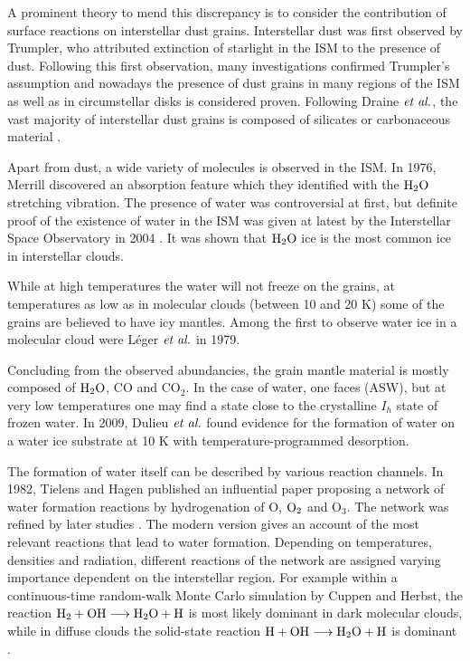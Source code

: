 \documentclass[8.5pt,twoside,twocolumn]{article}
\theoremstyle{standard}
\begin{document}
A prominent theory to mend this discrepancy is to consider the
contribution of surface reactions on interstellar dust
grains\cite{WilliamsHerbst2002}.
Interstellar dust was first observed by Trumpler\cite{Trumpler1930}, who attributed extinction of starlight in the ISM to the presence of dust. Following this first
observation, many investigations confirmed Trumpler's assumption and nowadays the presence
of dust grains in many regions of the ISM as well as in circumstellar disks is
considered proven. Following Draine $\emph{et al.}$, the vast majority of interstellar
dust grains is composed of silicates or carbonaceous material \cite{Draine2003}.

Apart from dust, a wide variety of molecules is observed in the ISM. In
1976, Merrill  \cite{Merrill1976} discovered an absorption feature
which they identified with the $\text H _2 \text O$ stretching vibration. The presence of
water was controversial at first, but definite proof of the existence of water
in the ISM was given at latest by the Interstellar Space Observatory in 2004
\cite{Gibb2004}. It was shown that $\text H _2 \text O$ ice is the most common ice in
interstellar clouds.

While at high temperatures the water will not freeze on the grains, at
temperatures as low as in molecular clouds (between 10 and 20
K\cite{Ferriere2001}) some of the grains are believed to have icy mantles.
Among the first to observe water ice in a molecular cloud were Léger $\emph{et al.}$ in
1979\cite{Leger1979}.

Concluding from the observed abundancies, the grain mantle material is mostly
composed of $\text H _2 \text O$, CO and CO$_2$.
In the case of water, one faces  (ASW), but at very
low temperatures one may find a state close to the crystalline $I_h$ state of
frozen water. In 2009, Dulieu $\emph{et al.}$ found evidence for the formation of water
on a water ice substrate at 10 K with temperature-programmed desorption. 

The formation of water itself can be described by various reaction channels. In
1982, Tielens and Hagen \cite{TielensHagen1982} published an influential paper
proposing a network of water formation reactions by hydrogenation of O, $\text O_2$
and O$_3$. The network was refined by later studies
\cite{RomanzinIoppoloCuppenEtAl2011}. The modern version gives an account of
the most relevant reactions that lead to water formation. Depending on
temperatures, densities and radiation, different reactions of the network are
assigned varying importance dependent on the interstellar region. For example
within a continuous-time random-walk Monte Carlo simulation by Cuppen and
Herbst, the reaction \mbox{$\text H_2+\text O \text H\longrightarrow\text H _2 \text O+\text H$} is most likely dominant
in dark molecular clouds, while in diffuse clouds the solid-state reaction
\mbox{$\text H+\text O \text H\longrightarrow\text H _2 \text O+\text H$} is dominant \cite{CuppenHerbst2007}.
\end{document}
